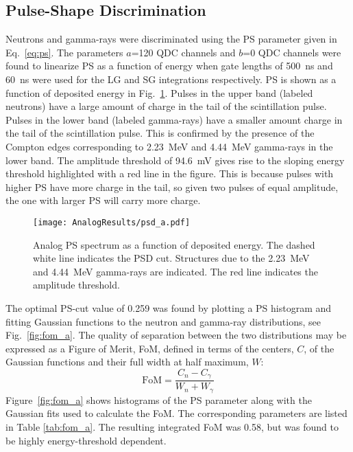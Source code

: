 \documentclass[main.tex]{subfiles}
\begin{document}
\subsection{Pulse-Shape Discrimination}
Neutrons and gamma-rays were discriminated using the PS parameter given in Eq.~\ref{eq:ps}. The parameters $a$=120 QDC channels and $b$=0 QDC channels were found to linearize PS as a function of energy when gate lengths of \SI{500}{\ns} and \SI{60}{ns} were used for the LG and SG integrations respectively.
PS is shown as a function of deposited energy in Fig.~\ref{fig:psd_a}. Pulses in the upper band (labeled neutrons) have a large amount of charge in the tail of the scintillation pulse. Pulses in the lower band (labeled gamma-rays) have a smaller amount charge in the tail of the scintillation pulse. 
This is confirmed by the presence of the Compton edges corresponding to \SI{2.23}{MeV} and \SI{4.44}{MeV} gamma-rays in the lower band. The amplitude threshold of \SI{94.6}{mV} gives rise to the sloping energy threshold highlighted with a red line in the figure. This is because pulses with higher PS  have more charge in the tail, so given two pulses of equal amplitude, the one with larger PS will carry more charge.
\begin{figure}[ht]
    \centering
        \texttt{[image: AnalogResults/psd\_a.pdf]}
        \caption[Analog PS spectrum as a function of deposited energy.]{Analog PS spectrum as a function of deposited energy. The dashed white line indicates the PSD cut. Structures due to the \SI{2.23}{MeV} and \SI{4.44}{MeV} gamma-rays are indicated. The red line indicates the amplitude threshold.}
        \label{fig:psd_a}
\end{figure}

The optimal PS-cut value of 0.259 was found by plotting a PS histogram and fitting Gaussian functions to the neutron and gamma-ray distributions, see Fig.~\ref{fig:fom_a}. The quality of separation between the two distributions may be expressed as a Figure of Merit, FoM, defined in terms of the centers, $C$, of the Gaussian functions and their full width at half maximum, $W$: 
\begin{equation}
\textrm{FoM} = \frac{C_n - C_\gamma}{W_n + W_\gamma}
\end{equation}
Figure~\ref{fig:fom_a} shows histograms of the PS parameter along with the Gaussian fits used to calculate the FoM. The corresponding parameters are listed in Table \ref{tab:fom_a}. The resulting integrated FoM was 0.58, but was found to be highly energy-threshold dependent. 
\end{document}
